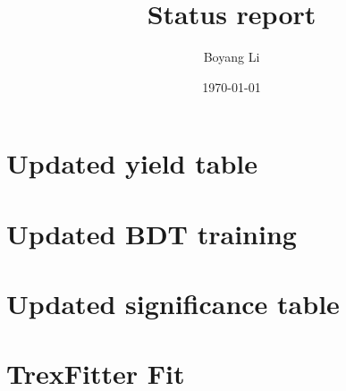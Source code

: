 \documentclass{beamer}
\title{Status report}
\date{\today}
\author[Boyang Li]{
  Boyang Li \\
}
\begin{document}
\begin{frame}
\titlepage
\end{frame}

\section{Updated yield table}
\begin{tiny} 

\end{tiny} 
\newpage
\frame{
\begin{footnotesize} 

\end{footnotesize} 
}
\newpage
\section{Updated BDT training}


\begin{tiny} 

\end{tiny} 
\newpage
\section{Updated significance table}
\begin{tiny} 

\end{tiny} 
\newpage
\frame{
\begin{footnotesize} 

\end{footnotesize} 
}
\section{TrexFitter Fit}
\vspace{50pt}
\end{document}
